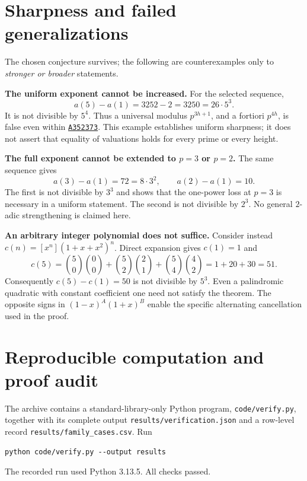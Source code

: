 \documentclass[11pt,a4paper]{article}
\numberwithin{equation}{section}
\theoremstyle{research}
\theoremstyle{definition}
\newcommand{\oeis}[1]{\href{https://oeis.org/#1}{\texttt{#1}}}
\begin{document}
\section{Sharpness and failed generalizations}
\label{sec:boundaries}
The chosen conjecture survives; the following are counterexamples only
to \emph{stronger or broader} statements.

\textbf{The uniform exponent cannot be increased.}
For the selected sequence,
\[
 a(5)-a(1)=3252-2=3250=26\cdot5^3.
\]
It is not divisible by $5^4$. Thus a universal modulus $p^{3h+1}$,
and a fortiori $p^{4h}$, is false even within \oeis{A352373}.
This example establishes uniform sharpness; it does not assert that
equality of valuations holds for every prime or every height.

\textbf{The full exponent cannot be extended to $p=3$ or $p=2$.}
The same sequence gives
\[
 a(3)-a(1)=72=8\cdot3^2,\qquad a(2)-a(1)=10.
\]
The first is not divisible by $3^3$ and shows that the one-power loss
at $p=3$ is necessary in a uniform statement. The second is not
divisible by $2^3$. No general $2$-adic strengthening is claimed here.

\textbf{An arbitrary integer polynomial does not suffice.}
Consider instead $c(n)=[x^n](1+x+x^2)^n$. Direct expansion gives
$c(1)=1$ and
\[
 c(5)=\binom50\binom00+\binom52\binom21+
       \binom54\binom42=1+20+30=51.
\]
Consequently $c(5)-c(1)=50$ is not divisible by $5^3$. Even a
palindromic quadratic with constant coefficient one need not satisfy
the theorem. The opposite signs in $(1-x)^A(1+x)^B$ enable the specific
alternating cancellation used in the proof.

\section{Reproducible computation and proof audit}
\label{sec:computation}
The archive contains a standard-library-only Python program,
\texttt{code/verify.py}, together with its complete output
\texttt{results/verification.json} and a row-level record
\texttt{results/family\_cases.csv}. Run
\begin{verbatim}
python code/verify.py --output results
\end{verbatim}
The recorded run used Python 3.13.5. All checks passed.
\end{document}
